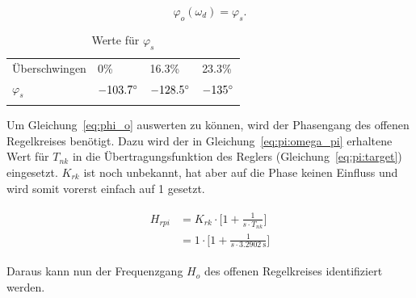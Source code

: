 
\begin{equation} \label{eq:phi_o}
    \varphi_o(\omega_d)=\varphi_s.
\end{equation}

\begin{longtable}{llll}
    \toprule
    \endhead
    \endfoot
    \endlastfoot


    \"Uberschwingen & 0\%              & 16.3\%           & 23.3\% \\
    $\varphi_s$        & $-103.7 \degree$ & $-128.5 \degree$ & $-135 \degree$ \\

    \bottomrule
    \caption{Werte f\"ur $\varphi_s$}
    \label{tab:phi_s}
\end{longtable}

Um    Gleichung~\ref{eq:phi_o}    auswerten     zu    k\"onnen,    wird    der
Phasengang   des   offenen   Regelkreises   ben\"otigt. Dazu   wird   der   in
Gleichung~\ref{eq:pi:omega_pi}    erhaltene    Wert    f\"ur    $T_{nk}$    in
die   \"Ubertragungsfunktion    des   Reglers   (Gleichung~\ref{eq:pi:target})
eingesetzt. $K_{rk}$  ist  noch  unbekannt,  hat aber  auf  die  Phase  keinen
Einfluss und wird somit vorerst einfach auf 1 gesetzt.

\begin{gather} \label{eq:pi:target:inserted}
    \begin{split}
        H_{rpi} & = K_{rk} \cdot \biggl[ 1 + \frac{1}{s \cdot T_{nk}} \biggr] \\
                & = 1      \cdot \biggl[ 1 + \frac{1}{s \cdot \SI{3.2902}{\second}} \biggr]
    \end{split}
\end{gather}

Daraus kann nun der Frequenzgang  $H_o$ des offenen Regelkreises identifiziert
werden.


